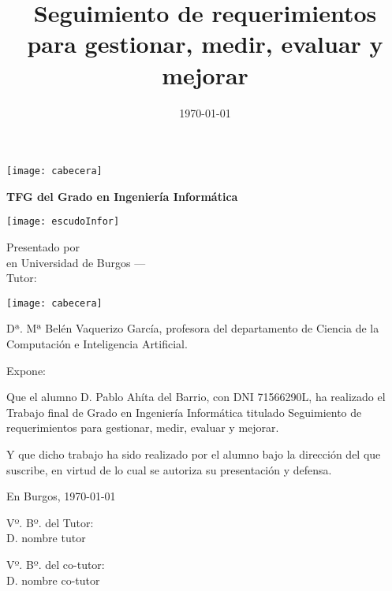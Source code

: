 \documentclass[a4paper,12pt,twoside]{memoir}
\title{ Seguimiento de requerimientos para gestionar, medir, evaluar y mejorar}
\author{\nombre}
\date{\today}
\makeatletter
\def\maketitle{
  \null
  \thispagestyle{empty}
\noindent\texttt{[image: cabecera]}\vspace{1cm}%
  \vfill
  \colorbox{cpardoBox}{%
    \begin{minipage}{.8\textwidth}
      \vspace{.5cm}\Large
      \begin{center}
      \textbf{TFG del Grado en Ingeniería Informática}\vspace{.6cm}\\
      \textbf{\LARGE\@title{}}
      \end{center}
      \vspace{.2cm}
    \end{minipage}

  }%
  \hfill\begin{minipage}{.20\textwidth}
    \texttt{[image: escudoInfor]}
  \end{minipage}
  \vfill
  \begin{center}%
  {%
    \noindent\LARGE
    Presentado por \@author{}\\ 
    en Universidad de Burgos --- \@date{}\\
    Tutor: \@tutor{}\\
  }%
  \end{center}%
  \null
  \cleardoublepage
  }
\newcommand{\nombre}{Pablo Ahíta del Barrio} %
\newcommand{\dni}{71566290L}
\makeatother
\begin{document}
\maketitle


\newpage\null\thispagestyle{empty}\newpage


\thispagestyle{empty}


\noindent\texttt{[image: cabecera]}\vspace{1cm}

\noindent Dª. Mª Belén Vaquerizo García, profesora del departamento de Ciencia de la Computación e Inteligencia Artificial.

\noindent Expone:

\noindent Que el alumno D. \nombre, con DNI \dni, ha realizado el Trabajo final de Grado en Ingeniería Informática titulado Seguimiento de requerimientos para gestionar, medir, evaluar y mejorar. 

\noindent Y que dicho trabajo ha sido realizado por el alumno bajo la dirección del que suscribe, en virtud de lo cual se autoriza su presentación y defensa.

\begin{center} %
En Burgos, {\large \today}
\end{center}

\vfill\vfill\vfill

\begin{minipage}{0.45\textwidth}
\begin{flushleft} %
Vº. Bº. del Tutor:\\[2cm]
D. nombre tutor
\end{flushleft}
\end{minipage}
\hfill
\begin{minipage}{0.45\textwidth}
\begin{flushleft} %
Vº. Bº. del co-tutor:\\[2cm]
D. nombre co-tutor
\end{flushleft}
\end{minipage}
\hfill

\vfill



\newpage\null\thispagestyle{empty}\newpage
\end{document}
